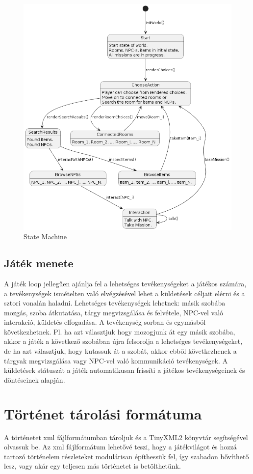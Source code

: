 \documentclass{scrarticle}
\begin{document}
\begin{figure}[H]
    \includegraphics[width=1.0\columnwidth]{State_Machine.png}
    \caption{State Machine}\label{fig:5}
\end{figure}
\newpage

\subsection{Játék menete}
A játék loop jellegűen ajánlja fel a lehetséges tevékenységeket a játékos számára, a tevékenységek ismételten való elvégzésével lehet a küldetések céljait elérni és a sztori vonalán haladni. Lehetséges tevékenységek lehetnek: másik szobába mozgás, szoba átkutatása, tárgy megvizsgálása és felvétele, NPC-vel való interakció, küldetés elfogadása. A tevékenység sorban és egymásból következhetnek. Pl. ha azt választjuk hogy mozogjunk át egy másik szobába, akkor a játék a következő szobában újra felsorolja a lehetséges tevékenységeket, de ha azt választjuk, hogy kutassuk át a szobát, akkor ebből következhenek a tárgyak megvizsgálása vagy NPC-vel való kommunikáció tevékenységek. A küldetések státuszát a játék automatikusan frissíti a játékos tevékenységeinek és döntéseinek alapján.

\section{Történet tárolási formátuma}
A történetet xml fájlformátumban tároljuk és a TinyXML2 könyvtár segítségével olvassuk be. Az xml fájlformátum lehetővé teszi, hogy a játékvilágot és hozzá tartozó történelem részleteket modulárisan építhessük fel, így szabadon bővíthető lesz, vagy akár egy teljesen más történetet is betölthetünk.
\end{document}
